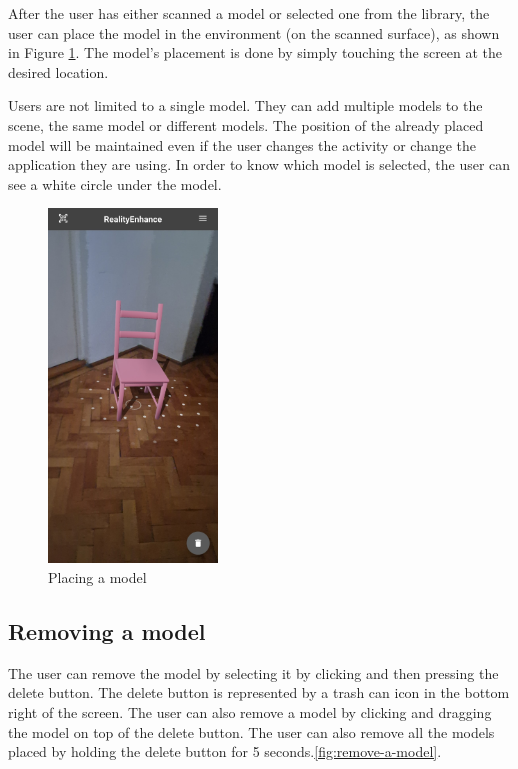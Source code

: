 After the user has either scanned a model or selected one from the library, the user can place the model in the environment (on the scanned surface), as shown in Figure \ref{fig:placed-model}. The model's placement is done by simply touching the screen at the desired location.

Users are not limited to a single model. They can add multiple models to the scene, the same model or different models. The position of the already placed model will be maintained even if the user changes the activity or change the application they are using. In order to know which model is selected, the user can see a white circle under the model.
\begin{figure}[ht]
    \begin{center}
        \includegraphics[width=0.4\textwidth]{img/App_screenshots/Model-placed.jpg}
        \caption{Placing a model}
        \label{fig:placed-model}
    \end{center}
\end{figure}
\pagebreak

\subsection{Removing a model}
The user can remove the model by selecting it by clicking and then pressing the delete button. The delete button is represented by a trash can icon in the bottom right of the screen. The user can also remove a model by clicking and dragging the model on top of the delete button. The user can also remove all the models placed by holding the delete button for 5 seconds.\ref{fig:remove-a-model}.

